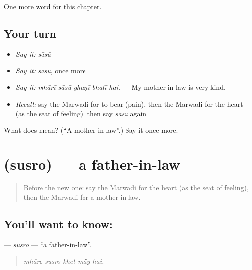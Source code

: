 \begin{grammarlens}[title={What you've built}]
One more word for this chapter.
\end{grammarlens}

\subsection*{Your turn}
\begin{itemize}
\raggedright
  \item \emph{Say it:} \emph{sāsū}
  \item \emph{Say it:} \emph{sāsū}, once more
  \item \emph{Say it:} \emph{mhārī sāsū ghaṇī bhalī hai.} — My mother-in-law is very kind.
  \item \emph{Recall:} say the Marwadi for to bear (pain), then the Marwadi for the heart (as the seat of feeling), then say \emph{sāsū} again
\end{itemize}

\begin{tcolorbox}[breakable,colback=teal!4,colframe=teal!35!black,title={Before you move on}]
What does  mean? (\textquotedblleft{}A mother-in-law\textquotedblright{}.) Say it once more.
\end{tcolorbox}
\section[\texorpdfstring{\mw{सुसरो} (susro)}{सुसरो (susro)}]{ (susro) — a father-in-law}

\label{lesson:MW-C259-susro}



\begin{quote}
Before the new one: say the Marwadi for the heart (as the seat of feeling), then the Marwadi for a mother-in-law.
\end{quote}

\subsection*{You'll want to know: }
\textbf{} — \emph{susro} — \textquotedblleft{}a father-in-law\textquotedblright{}.

\begin{quote}
    
\end{quote}

\begin{quote}
\emph{mhāro susro khet mā̃y hai.}
\end{quote}

